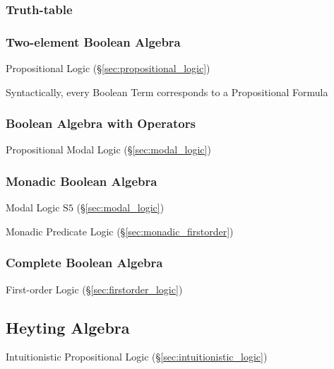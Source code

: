 \subsubsection{Truth-table}\label{sec:truth_table}

\subsubsection{Two-element Boolean Algebra}\label{sec:twoelement_boolean}

Propositional Logic (\S\ref{sec:propositional_logic})

Syntactically, every Boolean Term corresponds to a Propositional
Formula



\subsubsection{Boolean Algebra with Operators}\label{sec:boolean_with_operators}

Propositional Modal Logic (\S\ref{sec:modal_logic})



\subsubsection{Monadic Boolean Algebra}\label{sec:monadic_boolean}

Modal Logic $\mathrm{S5}$ (\S\ref{sec:modal_logic})

Monadic Predicate Logic (\S\ref{sec:monadic_firstorder})



\subsubsection{Complete Boolean Algebra}\label{sec:complete_boolean}

First-order Logic (\S\ref{sec:firstorder_logic})



\subsection{Heyting Algebra}\label{sec:heyting_algebra}

Intuitionistic Propositional Logic (\S\ref{sec:intuitionistic_logic})



